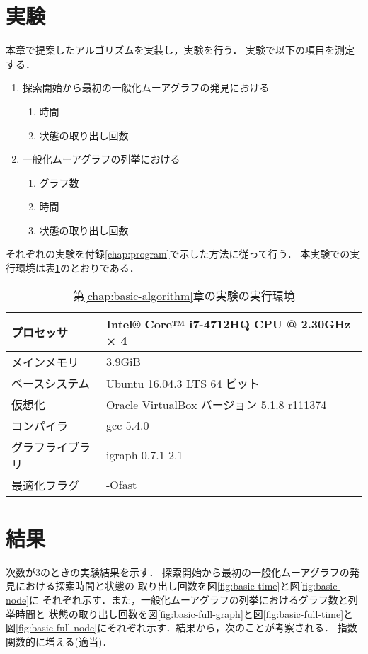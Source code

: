 \section{実験}
\label{sect:exp-basic-algorithm}
本章で提案したアルゴリズムを実装し，実験を行う．
実験で以下の項目を測定する．
\begin{enumerate}
\item 探索開始から最初の一般化ムーアグラフの発見における
  \begin{enumerate}
  \item 時間
  \item 状態の取り出し回数
  \end{enumerate}
\item 一般化ムーアグラフの列挙における
  \begin{enumerate}
  \item グラフ数
  \item 時間
  \item 状態の取り出し回数
  \end{enumerate}
\end{enumerate}
それぞれの実験を付録\ref{chap:program}で示した方法に従って行う．
本実験での実行環境は表\ref{tab:basic-algorithm-env}のとおりである．
\begin{table}
  \caption{第\ref{chap:basic-algorithm}章の実験の実行環境}
  \label{tab:basic-algorithm-env}
  \centering
  \begin{tabular}{ll}
    \hline
    プロセッサ & Intel® Core™ i7-4712HQ CPU @ 2.30GHz × 4 \\ \hline
    メインメモリ & 3.9GiB \\ \hline
    ベースシステム & Ubuntu 16.04.3 LTS 64 ビット \\ \hline
    仮想化 & Oracle VirtualBox バージョン 5.1.8 r111374 \\ \hline
    コンパイラ & gcc 5.4.0 \\ \hline
    グラフライブラリ & igraph 0.7.1-2.1 \\ \hline
    最適化フラグ & -Ofast \\ \hline
  \end{tabular}
\end{table}

\section{結果}
\label{sect:result-basic-algorithm}
次数が3のときの実験結果を示す．
探索開始から最初の一般化ムーアグラフの発見における探索時間と状態の
取り出し回数を図\ref{fig:basic-time}と図\ref{fig:basic-node}に
それぞれ示す．また，一般化ムーアグラフの列挙におけるグラフ数と列挙時間と
状態の取り出し回数を図\ref{fig:basic-full-graph}と図\ref{fig:basic-full-time}と
図\ref{fig:basic-full-node}にそれぞれ示す．結果から，次のことが考察される．
指数関数的に増える(適当)．

